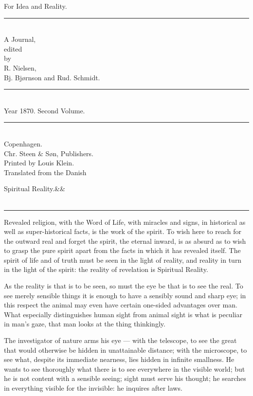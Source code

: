 \documentclass[12pt,a4paper,openany]{book}
\newcommand{\opage}[1]{\marginnote{\footnotesize\textit{[#1]}}}
\newcommand{\essayhead}[2]{\begin{center}{\large #1}\ifx&#2&\else\\[0.3em]{\normalsize #2}\fi\\[0.5em]\rule{3em}{0.4pt}\end{center}\medskip\noindent}
\begin{document}
\begin{titlepage}
\begin{center}
\vspace*{3em}
{\Huge For Idea and Reality.}\\[1em]
\rule{8em}{0.4pt}\\[1em]
{\large A Journal,}\\[0.8em]
{\small edited}\\[0.4em]
{\footnotesize by}\\[0.6em]
{\large R. Nielsen,}\\[0.4em]
{\large Bj. Bjørnson and Rud. Schmidt.}\\[1em]
\rule{8em}{0.4pt}\\[0.6em]
{\large Year 1870. Second Volume.}\\[0.6em]
\rule{8em}{0.4pt}\\[4em]
Copenhagen.\\[0.4em]
Chr. Steen \& Søn, Publishers.\\[1.5em]
{\small Printed by Louis Klein.}\\[3em]
{\small Translated from the Danish}
\end{center}
\end{titlepage}

\essayhead{Spiritual Reality.}{}
\setcounter{footnote}{0}%
\opage{289}Revealed religion, with the Word of Life, with miracles
and signs, in historical as well as super-historical facts,
is the work of the spirit. To wish here to reach for
the outward real and forget the spirit, the eternal
inward, is as absurd as to wish to grasp the
pure spirit apart from the facts in which it
has revealed itself. The spirit of life and of truth must
be seen in the light of reality, and reality in turn in
the light of the spirit: the reality of revelation is Spiritual Reality.

As the reality is that is to be seen, so
must the eye be that is to see the real. To
see merely sensible things it is enough to have a sensibly
sound and sharp eye; in this respect the animal
may even have certain one-sided advantages over man. What
especially distinguishes human sight from
animal sight is what is peculiar in man's gaze,
that man looks at the thing thinkingly.

The investigator of nature arms his eye --- with the telescope,
to see the great that would otherwise be hidden in
unattainable distance; with the microscope, to see what,
despite its immediate nearness, lies hidden in
\setcounter{footnote}{0}%
\opage{290}infinite smallness. He wants to see thoroughly what there is to see
everywhere in the visible world; but he is not content with
a sensible seeing; sight must serve his thought; he
searches in everything visible for the invisible: he inquires
after laws.
\end{document}
